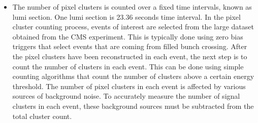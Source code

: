 \begin{itemize}
\item The number of pixel clusters is counted over a fixed time intervals, known as lumi section. One lumi section is 23.36 seconds time interval. In the pixel cluster counting process, events of interest are selected from the large dataset obtained from the CMS experiment. This is typically done using zero bias triggers that select events that are coming from filled bunch crossing.
  After the pixel clusters have been reconstructed in each event, the next step is to count the number of clusters in each event. This can be done using simple counting algorithms that count the number of clusters above a certain energy threshold. %
  The number of pixel clusters in each event is affected by various sources of background noise. %
  To accurately measure the number of signal clusters in each event, these background sources must be subtracted from the total cluster count.


\end{itemize}
